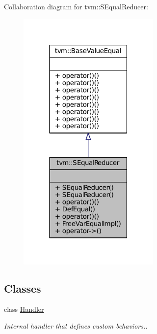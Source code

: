 Collaboration diagram for tvm\+:\+:S\+Equal\+Reducer\+:
\nopagebreak
\begin{figure}[H]
\begin{center}
\leavevmode
\includegraphics[width=198pt]{classtvm_1_1SEqualReducer__coll__graph}
\end{center}
\end{figure}
\subsection*{Classes}
\begin{DoxyCompactItemize}
\item 
class \hyperlink{classtvm_1_1SEqualReducer_1_1Handler}{Handler}
\begin{DoxyCompactList}\small\item\em Internal handler that defines custom behaviors.. \end{DoxyCompactList}\end{DoxyCompactItemize}
